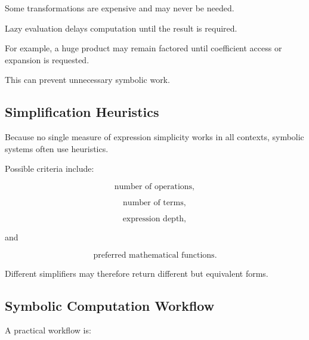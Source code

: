 Some transformations are expensive and may never be needed.

Lazy evaluation delays computation until the result is required.

For example, a huge product may remain factored until coefficient access
or expansion is requested.

This can prevent unnecessary symbolic work.

\subsection{Simplification Heuristics}
\label{subsec:simplification-heuristics}

Because no single measure of expression simplicity works in all contexts,
symbolic systems often use heuristics.

Possible criteria include:

\[
\boxed{
\text{number of operations},
}
\]

\[
\boxed{
\text{number of terms},
}
\]

\[
\boxed{
\text{expression depth},
}
\]

and

\[
\boxed{
\text{preferred mathematical functions}.
}
\]

Different simplifiers may therefore return different but equivalent forms.

\subsection{Symbolic Computation Workflow}
\label{subsec:symbolic-computation-workflow}

A practical workflow is:

